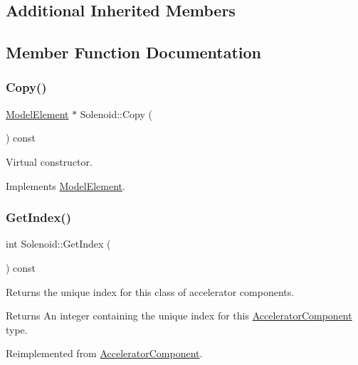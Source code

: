 \subsection*{Additional Inherited Members}


\subsection{Member Function Documentation}
\mbox{\label{classSolenoid_a712906ddbcacc761559736d01b04b513}} 
\subsubsection{\texorpdfstring{Copy()}{Copy()}}
{\footnotesize\ttfamily \hyperlink{classModelElement}{Model\+Element} $\ast$ Solenoid\+::\+Copy (\begin{DoxyParamCaption}{ }\end{DoxyParamCaption}) const\hspace{0.3cm}{\ttfamily [virtual]}}

Virtual constructor. 

Implements \hyperlink{classModelElement_ac3ca26d649bd86a0f31a58ae09941429}{Model\+Element}.

\mbox{\label{classSolenoid_a6aa64b57e6de710c77242d5e29a6ed8e}} 
\subsubsection{\texorpdfstring{Get\+Index()}{GetIndex()}}
{\footnotesize\ttfamily int Solenoid\+::\+Get\+Index (\begin{DoxyParamCaption}{ }\end{DoxyParamCaption}) const\hspace{0.3cm}{\ttfamily [virtual]}}

Returns the unique index for this class of accelerator components. \begin{DoxyReturn}{Returns}
An integer containing the unique index for this \hyperlink{classAcceleratorComponent}{Accelerator\+Component} type. 
\end{DoxyReturn}


Reimplemented from \hyperlink{classAcceleratorComponent_abd1490171ac9af6004d3da01fb3b95fb}{Accelerator\+Component}.

